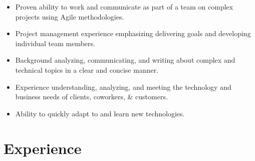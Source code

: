 \documentclass[10pt]{article}
\begin{document}
\begin{itemize}

    \item Proven ability to work and communicate as part of a team on complex projects using Agile methodologies.
    
    \item Project management experience emphasizing delivering goals and developing individual team members.

    \item Background analyzing, communicating, and writing about complex and technical topics in a clear and concise manner.

    \item Experience understanding, analyzing, and meeting the technology and business needs of clients, coworkers, \& customers.

    \item Ability to quickly adapt to and learn new technologies.

\end{itemize}



\section{Experience}
\end{document}
